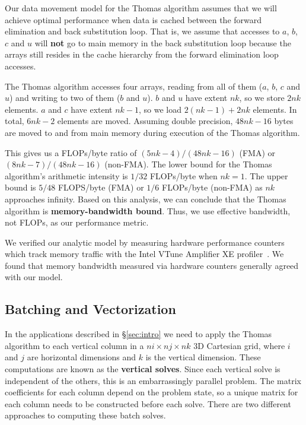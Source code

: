 \documentclass[10pt, conference, compsocconf]{IEEEtran}
\begin{document}
Our data movement model for the Thomas algorithm assumes that we will achieve
  optimal performance when data is cached between the forward elimination and
  back substitution loop.
That is, we assume that accesses to \(a\), \(b\), \(c\) and \(u\) will
  \textbf{not} go to main memory in the back substitution loop because the
  arrays still resides in the cache hierarchy from the forward elimination loop
  accesses.

The Thomas algorithm accesses four arrays, reading from all of them (\(a\),
  \(b\), \(c\) and \(u\)) and writing to two of them (\(b\) and \(u\)).
\(b\) and \(u\) have extent \(nk\), so we store \(2nk\) elements.
\(a\) and \(c\) have extent \(nk-1\), so we load \(2(nk-1)+2nk\) elements.
In total, \(6nk-2\) elements are moved.
Assuming double precision, \(48nk-16\) bytes are moved to and from main memory
  during execution of the Thomas algorithm.

This gives us a FLOPs/byte ratio of \((5nk-4)/(48nk-16)\) (FMA) or
  \((8nk-7)/(48nk-16)\) (non-FMA).
The lower bound for the Thomas algorithm's arithmetic intensity is \(1/32\)
  FLOPs/byte when \(nk=1\). 
The upper bound is \(5/48\) FLOPS/byte (FMA) or \(1/6\) FLOPs/byte (non-FMA) as
  \(nk\) approaches infinity.
Based on this analysis, we can conclude that the Thomas algorithm is
  \textbf{memory-bandwidth bound}.
Thus, we use effective bandwidth, not FLOPs, as our performance metric.

We verified our analytic model by measuring hardware performance counters which
  track memory traffic with the Intel VTune Amplifier XE
  profiler~\cite{intel_vtune_amplifier}.
We found that memory bandwidth measured via hardware counters generally agreed
  with our model. 

\subsection{Batching and Vectorization}
\label{sec:impl:batching_and_parallelism}

In the applications described in \S\ref{sec:intro} we need to apply the
  Thomas algorithm to each vertical column in a \(ni \times nj \times nk\)
  3D Cartesian grid, where \(i\) and \(j\) are horizontal dimensions and \(k\) is
  the vertical dimension.
These computations are known as the \textbf{vertical solves}.
Since each vertical solve is independent of the others, this is an
  embarrassingly parallel problem.
The matrix coefficients for each column depend on the problem state, so a
  unique matrix for each column needs to be constructed before each solve.
There are two different approaches to computing these batch solves.
\end{document}
